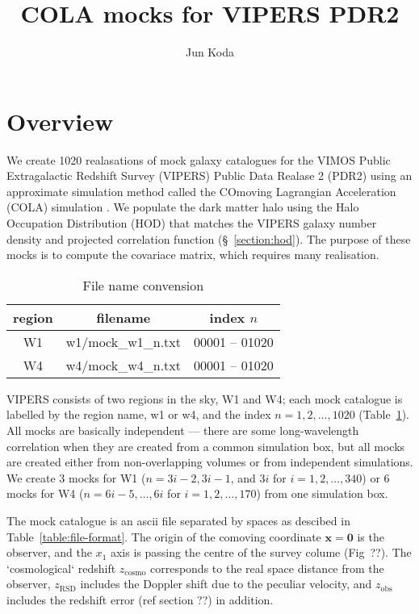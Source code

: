 \documentclass[a4paper,11pt]{article}
\title{COLA mocks for VIPERS PDR2}
\author{Jun Koda}
\date{}
\begin{document}
\maketitle

\section{Overview}

We create 1020 realasations of mock galaxy catalogues for the VIMOS
Public Extragalactic Redshift Survey (VIPERS) Public Data Realase 2
(PDR2) using an approximate simulation method called the COmoving
Lagrangian Acceleration (COLA) simulation
\citep{2013JCAP...06..036T}. We populate the dark matter halo using
the Halo Occupation Distribution (HOD) that matches the VIPERS galaxy
number density and projected correlation function
(\S~\ref{section:hod}). The purpose of these mocks is to compute the
covariace matrix, which requires many realisation.

\begin{table}[h]
\begin{center}
\begin{tabular}{ccc}
  \hline
  region & filename & index $n$\\
  \hline
  W1 & w1/mock\_w1\_n.txt & 00001 -- 01020\\
  W4 & w4/mock\_w4\_n.txt & 00001 -- 01020\\
  \hline
\end{tabular}
\caption{File name convension}
\label{table:filename}
\end{center}
\end{table}


\noindent VIPERS consists of two regions in the sky, W1 and W4; each
mock catalogue is labelled by the region name, w1 or w4, and the index
$n = 1,2,\dots,1020$ (Table~\ref{table:filename}). All mocks are
basically independent --- there are some long-wavelength correlation
when they are created from a common simulation box, but all mocks are
created either from non-overlapping volumes or from independent
simulations. We create 3 mocks for W1 ($n = 3i - 2, 3i - 1$, and $3i$
for $i=1,2,\dots, 340$) or 6 mocks for W4 ($n = 6i-5, \dots, 6i$ for
$i = 1,2,\dots,170$) from one simulation box.

The mock catalogue is an ascii file separated by spaces as descibed in
Table~\ref{table:file-format}. The origin of the comoving coordinate
$\bm{x} = \bm{0}$ is the observer, and the $x_1$ axis is passing the
centre of the survey colume (Fig~??). The `cosmological` redshift
$z_\mathrm{cosmo}$ corresponds to the real space distance from the observer,
$z_\mathrm{RSD}$ includes the Doppler shift due to the peculiar
velocity, and $z_\mathrm{obs}$ includes the redshift error (ref
section ??) in addition.
\end{document}
